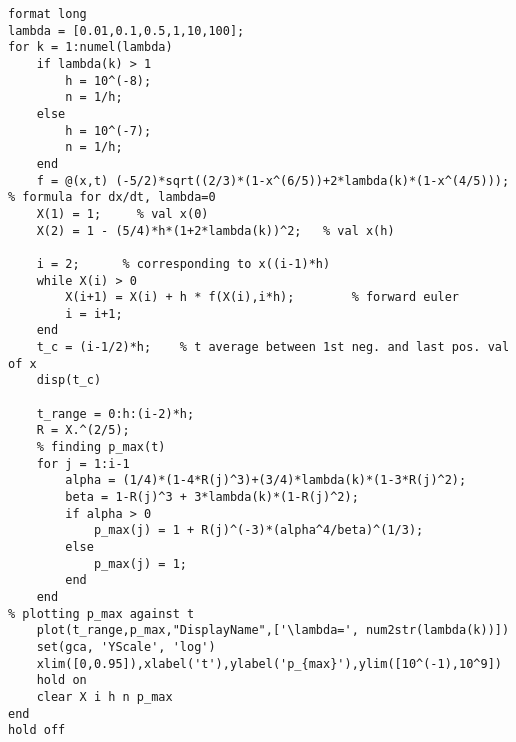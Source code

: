 \lstset{basicstyle=\footnotesize,style=myCustomMatlabStyle}
\begin{lstlisting}
format long
lambda = [0.01,0.1,0.5,1,10,100];
for k = 1:numel(lambda)
    if lambda(k) > 1
        h = 10^(-8);
        n = 1/h;
    else
        h = 10^(-7);
        n = 1/h;
    end
    f = @(x,t) (-5/2)*sqrt((2/3)*(1-x^(6/5))+2*lambda(k)*(1-x^(4/5)));    % formula for dx/dt, lambda=0
    X(1) = 1;     % val x(0)
    X(2) = 1 - (5/4)*h*(1+2*lambda(k))^2;   % val x(h)
    
    i = 2;      % corresponding to x((i-1)*h)
    while X(i) > 0
        X(i+1) = X(i) + h * f(X(i),i*h);        % forward euler
        i = i+1;
    end
    t_c = (i-1/2)*h;    % t average between 1st neg. and last pos. val of x
    disp(t_c)
    
    t_range = 0:h:(i-2)*h;
    R = X.^(2/5);
    % finding p_max(t)
    for j = 1:i-1
        alpha = (1/4)*(1-4*R(j)^3)+(3/4)*lambda(k)*(1-3*R(j)^2);
        beta = 1-R(j)^3 + 3*lambda(k)*(1-R(j)^2);
        if alpha > 0
            p_max(j) = 1 + R(j)^(-3)*(alpha^4/beta)^(1/3);
        else
            p_max(j) = 1;
        end
    end
% plotting p_max against t
    plot(t_range,p_max,"DisplayName",['\lambda=', num2str(lambda(k))])
    set(gca, 'YScale', 'log')
    xlim([0,0.95]),xlabel('t'),ylabel('p_{max}'),ylim([10^(-1),10^9])
    hold on
    clear X i h n p_max
end
hold off
\end{lstlisting}
